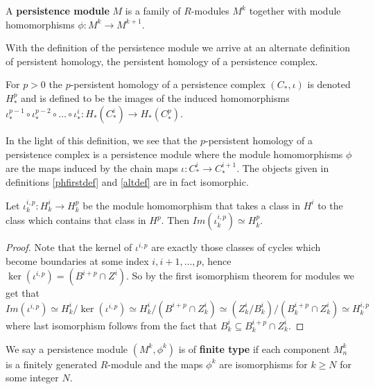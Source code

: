 \begin{definition}
  A \textbf{persistence module} $M$ is a family of $R$-modules $M^{k}$ together with module homomorphisms $\phi: M^{k} \to M^{k+1}$.
\end{definition}
With the definition of the persistence module we arrive at an alternate definition of persistent homology, the persistent homology of a persistence complex.
\begin{definition}\label{altdef} For $p>0$ the $p$-persistent homology of a persistence complex $(C_{*}, \iota)$ is denoted $H^{p}_{*}$ and is defined to be the images of the induced homomorphisms $\iota^{p-1}_{*} \circ \iota^{p-2}_{*} \circ \dots \circ \iota^{i}_{*}: H_{*}(C_{*}^{i}) \to H_{*}(C^{p}_{*})$.
\end{definition}
In the light of this definition, we see that the $p$-persistent homology of a persistence complex is a persistence module where the module homomorphisms $\phi$ are the maps induced by the chain maps $\iota: C^{i}_{*} \to C_{*}^{i+1}$. The objects given in definitions \ref{phfirstdef} and \ref{altdef} are in fact isomorphic.
\begin{lemma}
Let $\iota^{i,p}_k: H^{i}_{k} \to H^{p}_{k}$ be the module homomorphism that takes a class in $H^{i}$ to the class which contains that class in $H^{p}$. Then $Im (\iota^{i,p}_{k}) \simeq H^{p}_{k}$.
\end{lemma}
\begin{proof}
  Note that the kernel of $\iota^{{i,p}}$ are exactly those classes of cycles which become boundaries at some index $i,i+1,\dots,p$, hence $\ker (\iota^{i,p}) = (B^{i+p} \cap Z^{i})$. So by the first isomorphism theorem for modules we get that
  \[ Im (\iota^{i,p}) \simeq H^{i}_{k} / \ker(\iota^{i,p}) \simeq H^{i}_{k} / (B^{i+p} \cap Z_{k}^{i}) \simeq (Z^{i}_{k}/B^{i}_{k})/(B^{i+p}_{k}\cap Z^{i}_{k}) \simeq H^{i,p}_{k} \]
  where last isomorphism follows from the fact that $B^{i}_{k} \subseteq B_{k}^{i+p} \cap Z^{i}_{k}$.
\end{proof}

\begin{definition}
We say a persistence module $(M^{k}, \phi^{k})$ is of \textbf{finite type} if each component $M^{k}_{n}$ is a finitely generated $R$-module and the maps $\phi^{k}$ are isomorphisms for $k \geq N$ for some integer $N$.
\end{definition}


